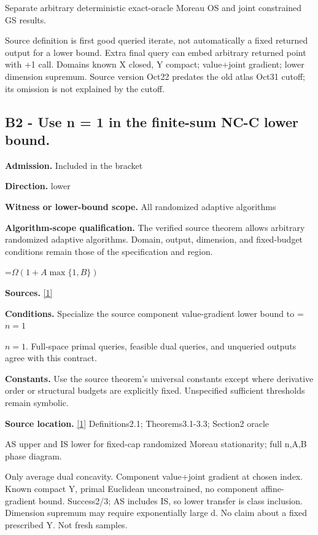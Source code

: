 \documentclass[10pt,a4paper]{article}
\newcommand{\AtlasMath}[1]{\par\begingroup\centering\setbox0=\hbox{$\displaystyle #1$}\ifdim\wd0>1.4\linewidth\typeout{ATLAS WIDE FORMULA: \the\wd0}\fi\ifdim\wd0>\linewidth\resizebox{\linewidth}{!}{\box0}\else\box0\fi\par\endgroup}
\newcommand{\AtlasInlineMath}[1]{\begingroup\setbox0=\hbox{$#1$}\ifdim\wd0>.4\linewidth\endgroup\AtlasMath{#1}\else\endgroup$#1$\fi}
\begin{document}
Separate arbitrary deterministic exact-oracle Moreau OS and joint constrained GS results.

Source definition is first good queried iterate, not automatically a fixed returned output for a lower bound. Extra final query can embed arbitrary returned point with +1 call. Domains known X closed, Y compact; value+joint gradient; lower dimension supremum. Source version Oct22 predates the old atlas Oct31 cutoff; its omission is not explained by the cutoff.

\subsection{B2 - Use n = 1 in the finite-sum NC-C lower bound.}
\textbf{Admission.} Included in the bracket

\textbf{Direction.} lower

\textbf{Witness or lower-bound scope.} All randomized adaptive algorithms

\textbf{Algorithm-scope qualification.} The verified source theorem allows arbitrary randomized adaptive algorithms. Domain, output, dimension, and fixed-budget conditions remain those of the specification and region.

\AtlasMath{\Omega(1+A\max\{1,B\})}
\textbf{Sources.} \href{https://arxiv.org/pdf/2610.16991v2}{[1]}

\textbf{Conditions.} Specialize the source component value-gradient lower bound to \AtlasInlineMath{n=1}. Full-space primal queries, feasible dual queries, and unqueried outputs agree with this contract.

\textbf{Constants.} Use the source theorem’s universal constants except where derivative order or structural budgets are explicitly fixed. Unspecified sufficient thresholds remain symbolic.

\textbf{Source location.} \href{https://arxiv.org/pdf/2610.16991v2}{[1]} Definitions2.1; Theorems3.1-3.3; Section2 oracle

AS upper and IS lower for fixed-cap randomized Moreau stationarity; full n,A,B phase diagram.

Only average dual concavity. Component value+joint gradient at chosen index. Known compact Y, primal Euclidean unconstrained, no component affine-gradient bound. Success2/3; AS includes IS, so lower transfer is class inclusion. Dimension supremum may require exponentially large d. No claim about a fixed prescribed Y. Not fresh samples.
\end{document}
